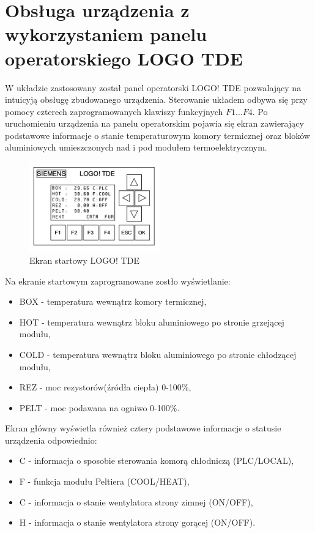 \documentclass[oneside]{mgr}
\begin{document}
\section{Obsługa urządzenia z wykorzystaniem panelu operatorskiego LOGO TDE}
W układzie zastosowany został panel operatorski LOGO! TDE pozwalający na intuicyją obsługę zbudowanego urządzenia. Sterowanie układem odbywa się przy pomocy czterech zaprogramowanych klawiszy funkcyjnych $F1 \dots F4$. Po uruchomieniu urządzenia na panelu operatorskim pojawia się ekran zawierający podstawowe informacje o stanie temperaturowym komory termicznej oraz bloków aluminiowych umieszczonych nad i pod modułem termoelektrycznym.
\begin{center}
\begin{figure}[h!]
    \centering
    \includegraphics[width=0.5\textwidth]{Ekran1.jpg}
    \caption{Ekran startowy LOGO! TDE}
    \end{figure}
\end{center}
Na ekranie startowym zaprogramowane zostło wyświetlanie:
\begin{itemize}
    \item BOX - temperatura wewnątrz komory termicznej,
    \item HOT - temperatura wewnątrz bloku aluminiowego po stronie grzejącej modułu,
    \item COLD - temperatura wewnątrz bloku aluminiowego po stronie chłodzącej modułu,
    \item REZ - moc rezystorów(źródła ciepła) 0-100\%,
    \item PELT - moc podawana na ogniwo 0-100\%.
\end{itemize}
Ekran główny wyświetla również cztery podstawowe informacje o statusie urządzenia odpowiednio:
\begin{itemize}
    \item C - informacja o sposobie sterowania komorą chłodniczą (PLC/LOCAL),
    \item F - funkcja modułu Peltiera (COOL/HEAT),
    \item C - informacja o stanie wentylatora strony zimnej (ON/OFF),
    \item H - informacja o stanie wentylatora strony gorącej (ON/OFF).
\end{itemize}
\end{document}
